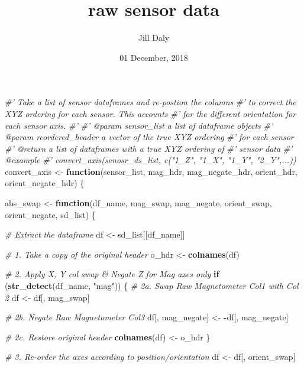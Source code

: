 \documentclass[]{article}
\title{raw sensor data}
\author{Jill Daly}
\date{01 December, 2018}
\newenvironment{Shaded}{\begin{snugshade}}{\end{snugshade}}
\newcommand{\CommentTok}[1]{\textcolor[rgb]{0.56,0.35,0.01}{\textit{#1}}}
\newcommand{\ControlFlowTok}[1]{\textcolor[rgb]{0.13,0.29,0.53}{\textbf{#1}}}
\newcommand{\KeywordTok}[1]{\textcolor[rgb]{0.13,0.29,0.53}{\textbf{#1}}}
\newcommand{\NormalTok}[1]{#1}
\newcommand{\OperatorTok}[1]{\textcolor[rgb]{0.81,0.36,0.00}{\textbf{#1}}}
\newcommand{\StringTok}[1]{\textcolor[rgb]{0.31,0.60,0.02}{#1}}
\begin{document}
\maketitle

{
\setcounter{tocdepth}{2}
\tableofcontents
}
\begin{Shaded}
\begin{Highlighting}[]
\CommentTok{#' Take a list of sensor dataframes and re-postion the columns}
\CommentTok{#' to correct the XYZ ordering for each sensor. This accounts }
\CommentTok{#' for the different orientation for each sensor axis.}
\CommentTok{#' }
\CommentTok{#' @param sensor_list a list of dataframe objects}
\CommentTok{#' @param reordered_header a vector of the true XYZ ordering}
\CommentTok{#' for each sensor}
\CommentTok{#' @return a list of dataframes with a true XYZ ordering of }
\CommentTok{#' sensor data}
\CommentTok{#' @example }
\CommentTok{#' convert_axis(senosr_ds_list, c("1_Z", "1_X", "1_Y", "2_Y",...))}
\NormalTok{convert_axis <-}\StringTok{ }\ControlFlowTok{function}\NormalTok{(sensor_list, mag_hdr, mag_negate_hdr, orient_hdr, orient_negate_hdr) \{}
  
\NormalTok{  abs_swap <-}\StringTok{ }\ControlFlowTok{function}\NormalTok{(df_name, mag_swap, mag_negate, orient_swap, orient_negate, sd_list) \{}

    \CommentTok{# Extract the dataframe}
\NormalTok{    df <-}\StringTok{ }\NormalTok{sd_list[[df_name]]}
    
    \CommentTok{# 1. Take a copy of the original header}
\NormalTok{    o_hdr <-}\StringTok{ }\KeywordTok{colnames}\NormalTok{(df)}
    
    \CommentTok{# 2. Apply X, Y col swap & Negate Z for Mag axes only}
    \ControlFlowTok{if}\NormalTok{ (}\KeywordTok{str_detect}\NormalTok{(df_name, }\StringTok{"mag"}\NormalTok{)) \{}
      \CommentTok{# 2a. Swap Raw Magnetometer Col1 with Col 2}
\NormalTok{      df <-}\StringTok{ }\NormalTok{df[, mag_swap] }

      \CommentTok{# 2b. Negate Raw Magnetometer Col3}
\NormalTok{      df[, mag_negate] <-}\StringTok{ }\OperatorTok{-}\NormalTok{df[, mag_negate]}

      \CommentTok{# 2c. Restore original header}
      \KeywordTok{colnames}\NormalTok{(df) <-}\StringTok{ }\NormalTok{o_hdr}
\NormalTok{    \}}
    
    \CommentTok{# 3. Re-order the axes according to position/orientation}
\NormalTok{    df <-}\StringTok{ }\NormalTok{df[, orient_swap] }
    

\end{Highlighting}
\end{Shaded}
\end{document}
